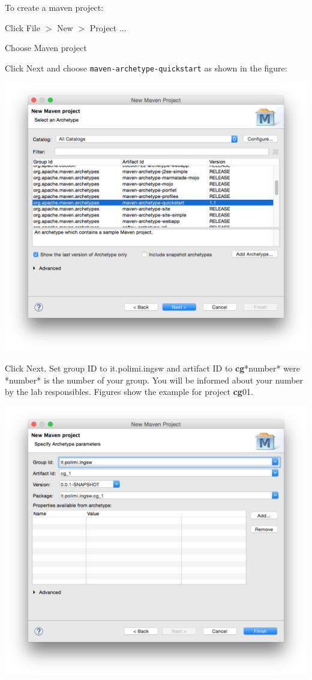 \documentclass{article}
\newif\ifghezzi
\newcommand{\prof}{\textbf{cg}}
\newcommand{\prof}{\textbf{ps}}
\begin{document}
To create a maven project:
\begin{compactitem}
\item Click File $>$ New $>$ Project ...
\item Choose Maven project
\item Click Next and choose \texttt{maven-archetype-quickstart} as
  shown in the figure:
\begin{center}
\includegraphics[scale=0.5]{figures/2}
\end{center}
\item Click Next. Set group ID to it.polimi.ingsw and artifact ID
  to 
  \prof*number* were *number* is the number of your group. You will
  be informed about your number by the lab responsibles. Figures show
  the example for project \prof01.
\begin{center}
\ifghezzi
\includegraphics[scale=0.5]{figures/3}

\end{center}
\end{compactitem}
\end{document}
